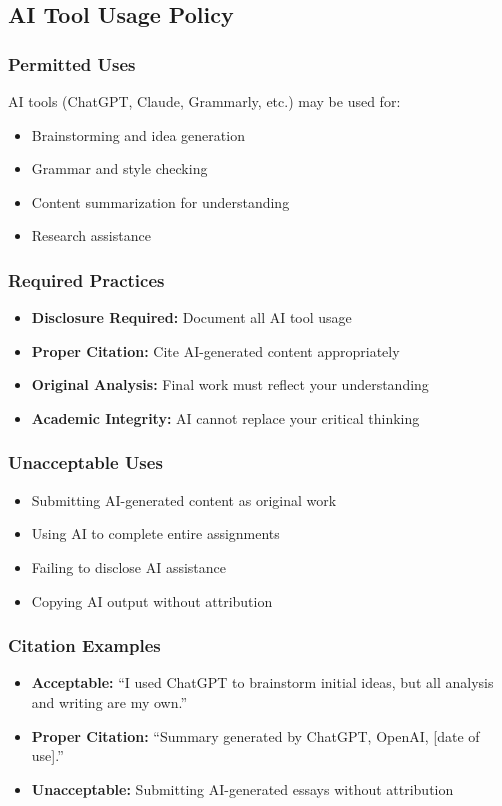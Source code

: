 \documentclass[11pt]{scrartcl} %
\begin{document}
\subsection{AI Tool Usage Policy}

\subsubsection{Permitted Uses}
AI tools (ChatGPT, Claude, Grammarly, etc.) may be used for:
\begin{itemize}
\item Brainstorming and idea generation
\item Grammar and style checking
\item Content summarization for understanding
\item Research assistance
\end{itemize}

\subsubsection{Required Practices}
\begin{itemize}
\item \textbf{Disclosure Required:} Document all AI tool usage
\item \textbf{Proper Citation:} Cite AI-generated content appropriately
\item \textbf{Original Analysis:} Final work must reflect your understanding
\item \textbf{Academic Integrity:} AI cannot replace your critical thinking
\end{itemize}

\subsubsection{Unacceptable Uses}
\begin{itemize}
\item Submitting AI-generated content as original work
\item Using AI to complete entire assignments
\item Failing to disclose AI assistance
\item Copying AI output without attribution
\end{itemize}

\subsubsection{Citation Examples}
\begin{itemize}
\item \textbf{Acceptable:} ``I used ChatGPT to brainstorm initial ideas, but all analysis and writing are my own.''
\item \textbf{Proper Citation:} ``Summary generated by ChatGPT, OpenAI, [date of use].''
\item \textbf{Unacceptable:} Submitting AI-generated essays without attribution
\end{itemize}
\end{document}
